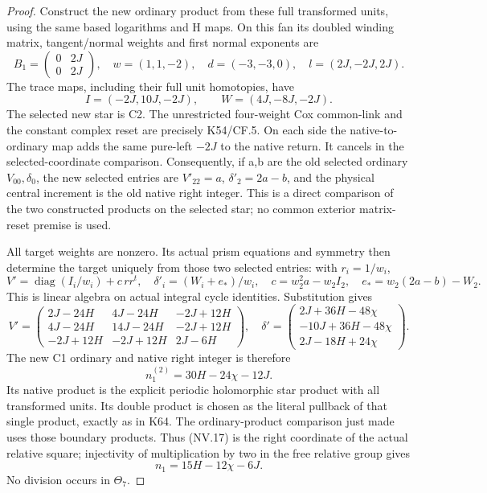 \begin{proof}
Construct the new ordinary product from these full transformed units,
using the same based logarithms and H maps. On this fan its doubled
winding matrix, tangent/normal weights and first normal exponents are
\[
 B_1=\begin{pmatrix}0&2J\\0&2J\end{pmatrix},\quad
 w=(1,1,-2),\quad d=(-3,-3,0),\quad l=(2J,-2J,2J).
\tag{NV.13}
\]
The trace maps, including their full unit homotopies, have
\[
 I=(-2J,10J,-2J),\qquad W=(4J,-8J,-2J).
\tag{NV.14}
\]
The selected new star is C2. The unrestricted four-weight Cox
common-link and the constant complex reset are precisely K54/CF.5.
On each side the native-to-ordinary map adds the same pure-left
\(-2J\) to the native return. It cancels in the selected-coordinate
comparison. Consequently, if a,b are the old selected ordinary
\(V_{00},\delta_0\), the new selected entries are
\(V'_{22}=a\), \(\delta'_2=2a-b\), and the physical central
increment is the old native right integer. This is a direct comparison
of the two constructed products on the selected star; no common
exterior matrix-reset premise is used.

All target weights are nonzero. Its actual prism equations and
symmetry then determine the target uniquely from those two selected
entries: with \(r_i=1/w_i\),
\[
 V'=\operatorname{diag}(I_i/w_i)+c\,rr^t,\quad
 \delta'_i=(W_i+e_*)/w_i,\quad
 c=w_2^2a-w_2I_2,\quad e_*=w_2(2a-b)-W_2.
\tag{NV.15}
\]
This is linear algebra on actual integral cycle identities. Substitution
gives
\[
 V'=\begin{pmatrix}
 2J-24H&4J-24H&-2J+12H\\
 4J-24H&14J-24H&-2J+12H\\
 -2J+12H&-2J+12H&2J-6H
 \end{pmatrix},\quad
 \delta'=\begin{pmatrix}
 2J+36H-48\chi\\-10J+36H-48\chi\\2J-18H+24\chi
 \end{pmatrix}.
\tag{NV.16}
\]
The new C1 ordinary and native right integer is therefore
\[
 n_1^{(2)}=30H-24\chi-12J.
\tag{NV.17}
\]
Its native product is the explicit periodic holomorphic star product
with all transformed units. Its double product is chosen as the
literal pullback of that single product, exactly as in K64. The
ordinary-product comparison just made uses those boundary products.
Thus (NV.17) is the right coordinate of the actual relative square;
injectivity of multiplication by two in the free relative group gives
\[
 n_1=15H-12\chi-6J.
\tag{NV.18}
\]
No division occurs in \(\Theta_7\).


\end{proof}
